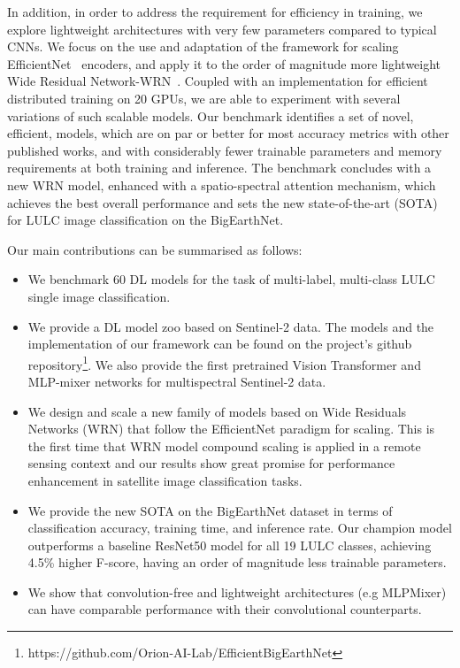 \documentclass[journal]{IEEEtran}
\begin{document}
In addition, in order to address the requirement for efficiency in training, we explore lightweight architectures with very few parameters compared to typical CNNs. We focus on the use and adaptation of the framework for scaling EfficientNet~\citep{pmlr-v97-tan19a} encoders, and apply it to the order of magnitude more lightweight Wide Residual Network-WRN~\citep{DBLP:journals/corr/ZagoruykoK16}. Coupled with an implementation for efficient distributed training on 20 GPUs, we are able to experiment with several variations of such scalable models. Our benchmark identifies a set of novel, efficient, models, which are on par or better for most accuracy metrics with other published works, and with considerably fewer trainable parameters and memory requirements at both training and inference. The benchmark concludes with a new WRN model, enhanced with a spatio-spectral attention mechanism, which achieves the best overall performance and sets the new state-of-the-art (SOTA) for LULC image classification on the BigEarthNet. 












Our main contributions can be summarised as follows:
\begin{itemize}
    \item We benchmark 60 DL models for the task of multi-label, multi-class LULC single image classification. 
    
    \item We provide a DL model zoo based on Sentinel-2 data. The models and the implementation of our framework can be found on the project's github repository\footnote{https://github.com/Orion-AI-Lab/EfficientBigEarthNet}. We also provide the first pretrained Vision Transformer and MLP-mixer networks for multispectral Sentinel-2 data.
    
    \item We design and scale a new family of models based on Wide Residuals Networks (WRN) that follow the EfficientNet paradigm for scaling. This is the first time that WRN model compound scaling is applied in a remote sensing context and our results show great promise for performance enhancement in satellite image classification tasks. 
   
    \item We provide the new SOTA on the BigEarthNet dataset in terms of classification accuracy, training time, and inference rate. Our champion model outperforms a baseline ResNet50 model for all 19 LULC classes, achieving 4.5\% higher F-score, having an order of magnitude less trainable parameters.
    


\item We show that convolution-free and lightweight architectures (e.g MLPMixer) can have comparable performance with their convolutional counterparts.
    


\end{itemize}
\end{document}
